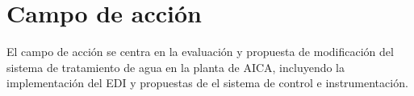 \section*{Campo de acción}
El campo de acción se centra en la evaluación y propuesta de
modificación del sistema de tratamiento de agua en la planta de
AICA, incluyendo la implementación del EDI y propuestas
de el sistema de control e instrumentación.